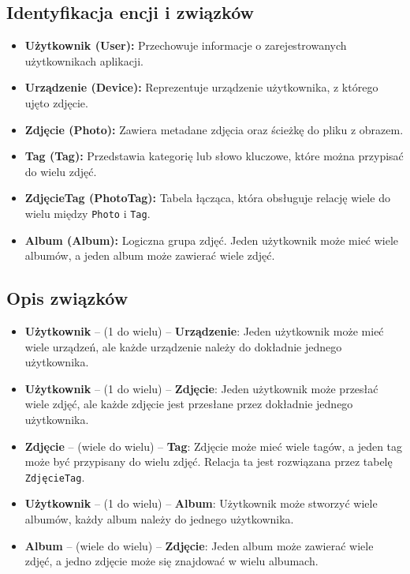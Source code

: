 \documentclass[12pt,a4paper]{article}
\begin{document}
\subsection{Identyfikacja encji i związków}
\begin{itemize}
    \item \textbf{Użytkownik (User):} Przechowuje informacje o zarejestrowanych użytkownikach aplikacji.
    \item \textbf{Urządzenie (Device):} Reprezentuje urządzenie użytkownika, z którego ujęto zdjęcie.
    \item \textbf{Zdjęcie (Photo):} Zawiera metadane zdjęcia oraz ścieżkę do pliku z obrazem.
    \item \textbf{Tag (Tag):} Przedstawia kategorię lub słowo kluczowe, które można przypisać do wielu zdjęć.
    \item \textbf{ZdjęcieTag (PhotoTag):} Tabela łącząca, która obsługuje relację wiele do wielu między \texttt{Photo} i \texttt{Tag}.
    \item \textbf{Album (Album):} Logiczna grupa zdjęć. Jeden użytkownik może mieć wiele albumów, a jeden album może zawierać wiele zdjęć.
\end{itemize}

\subsection{Opis związków}
\begin{itemize}
    \item \textbf{Użytkownik} -- (1 do wielu) -- \textbf{Urządzenie}: Jeden użytkownik może mieć wiele urządzeń, ale każde urządzenie należy do dokładnie jednego użytkownika.
    \item \textbf{Użytkownik} -- (1 do wielu) -- \textbf{Zdjęcie}: Jeden użytkownik może przesłać wiele zdjęć, ale każde zdjęcie jest przesłane przez dokładnie jednego użytkownika.
    \item \textbf{Zdjęcie} -- (wiele do wielu) -- \textbf{Tag}: Zdjęcie może mieć wiele tagów, a jeden tag może być przypisany do wielu zdjęć. Relacja ta jest rozwiązana przez tabelę \texttt{ZdjęcieTag}.
    \item \textbf{Użytkownik} -- (1 do wielu) -- \textbf{Album}: Użytkownik może stworzyć wiele albumów, każdy album należy do jednego użytkownika.
    \item \textbf{Album} -- (wiele do wielu) -- \textbf{Zdjęcie}: Jeden album może zawierać wiele zdjęć, a jedno zdjęcie może się znajdować w wielu albumach.
\end{itemize}
\end{document}
